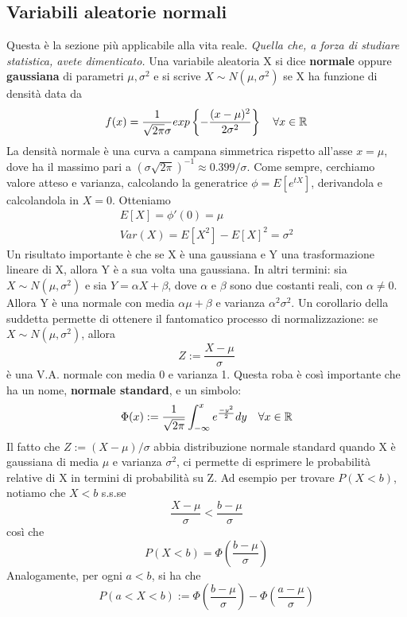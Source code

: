 \documentclass[11pt]{article}
\begin{document}
\subsection{Variabili aleatorie normali}
Questa è la sezione più applicabile alla vita reale. \textit{Quella che, a forza di studiare statistica, avete dimenticato.} 
Una variabile aleatoria X si dice \textbf{normale} oppure \textbf{gaussiana} di parametri $\mu,\sigma^2$ e si scrive $X \sim N(\mu,\sigma^2)$ se X ha funzione di densità data da
\begin{displaymath}
    f(x)= \frac{1}{\sqrt{2\pi}\sigma} exp\left\{-\frac{(x-\mu)^2}{2\sigma^2}\right\} \hspace{10px}\forall x \in \mathbb{R} 
\end{displaymath}
La densità normale è una curva a campana simmetrica rispetto all'asse $x=\mu$, dove ha il massimo pari a $(\sigma\sqrt{2\pi})^{-1} \approx  0.399/\sigma$.
Come sempre, cerchiamo valore atteso e varianza, calcolando la generatrice $\phi = E[e^{tX}]$, derivandola e calcolandola in $X=0$. Otteniamo 
\begin{gather*}
    E[X]=\phi'(0)=\mu\\ 
    Var(X) = E[X^2]- E[X]^2 = \sigma^2
\end{gather*}
Un risultato importante è che se X è una gaussiana e Y una trasformazione lineare di X, allora Y è a sua volta una gaussiana. In altri termini:
sia $X\sim N(\mu, \sigma^2)$ e sia $Y=\alpha X + \beta$, dove $\alpha$ e $\beta$ sono due costanti reali, con $\alpha\neq 0$. Allora Y è una normale con media $\alpha\mu + \beta$ e varianza $\alpha^2\sigma^2$.
Un corollario della suddetta permette di ottenere il fantomatico processo di normalizzazione: se $X\sim N(\mu,\sigma^2)$, allora
\begin{displaymath}
    Z:=\frac{X-\mu}{\sigma}
\end{displaymath}
è una V.A. normale con media 0 e varianza 1. Questa roba è così importante che ha un nome, \textbf{normale standard}, e un simbolo:
\begin{displaymath}
    \Phi(x) := \frac{1}{\sqrt{2\pi}}\int_{-\infty}^x e^{\frac{-y^2}{2}}dy\hspace{10px}\forall x \in \mathbb{R}
\end{displaymath}
Il fatto che $Z:=(X-\mu)/\sigma$ abbia distribuzione normale standard quando X è gaussiana di media $\mu$ e varianza $\sigma^2$, ci permette di esprimere le probabilità relative di X in termini di probabilità su Z. Ad esempio per trovare $P(X<b)$, notiamo che $X<b$ s.s.se 
\begin{displaymath}
    \frac{X-\mu}{\sigma} < \frac{b-\mu}{\sigma}
\end{displaymath}
così che
\begin{displaymath}
    P(X<b) = \Phi\left(\frac{b-\mu}{\sigma}\right)
\end{displaymath}
Analogamente, per ogni $a<b$, si ha che 
\begin{displaymath}
    P(a<X<b) := \Phi\left(\frac{b-\mu}{\sigma}\right)-\Phi\left(\frac{a-\mu}{\sigma}\right)
\end{displaymath}
\end{document}
